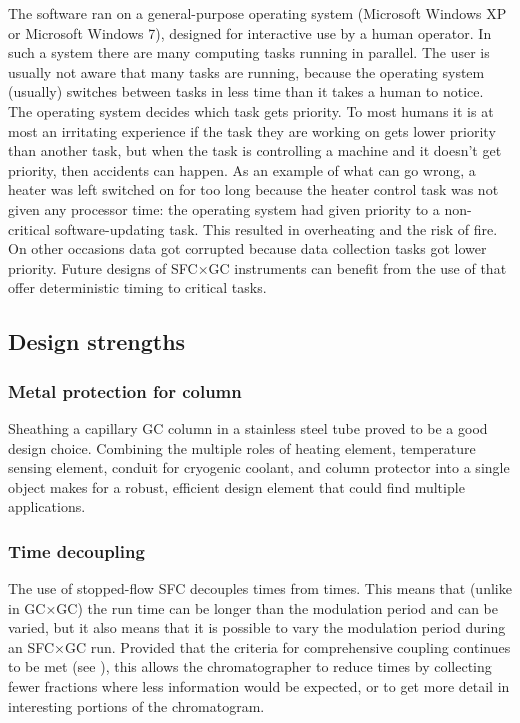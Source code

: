 The software ran on a general-purpose operating system (Microsoft Windows XP or
Microsoft Windows 7), designed for interactive use by a human operator. In such
a system there are many computing tasks running in parallel. The user is usually
not aware that many tasks are running, because the operating system (usually)
switches between tasks in less time than it takes a human to notice. The
operating system decides which task gets priority. To most humans it is at most
an irritating experience if the task they are working on gets lower priority
than another task, but when the task is controlling a machine and it doesn't get
priority, then accidents can happen. As an example of what can go wrong, a
heater was left switched on for too long because the heater control task was not
given any processor time: the operating system had given priority to a
non-critical software-updating task. This resulted in overheating and the risk
of fire. On other occasions data got corrupted because data collection tasks got
lower priority. Future designs of SFC×GC instruments can benefit from the use of
 that offer deterministic timing to
critical tasks.

\subsection{Design strengths}

\subsubsection{Metal protection for column}

Sheathing a capillary GC column in a stainless steel tube proved to be a good
design choice. Combining the multiple roles of heating element, temperature
sensing element, conduit for cryogenic coolant, and column protector into a
single object makes for a robust, efficient design element that could find
multiple applications.

\subsubsection{Time decoupling}

The use of stopped-flow SFC decouples \oneD times from \twoD times. This means
that (unlike in GC×GC) the \twoD run time can be longer than the modulation
period and can be varied, but it also means that it is possible to vary the
modulation period during an SFC×GC run. Provided that the criteria for
comprehensive coupling continues to be met (see \label{sec:SpeedOfAnalysis}),
this allows the chromatographer to reduce times by collecting fewer fractions
where less information would be expected, or to get more detail in interesting
portions of the \oneD chromatogram.

